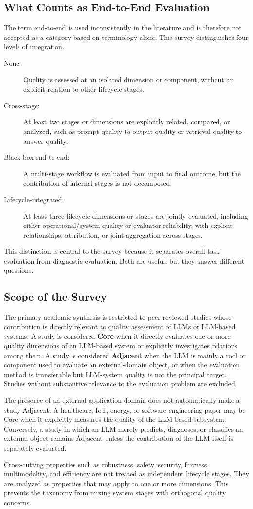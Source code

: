 \subsection{What Counts as End-to-End Evaluation}

The term end-to-end is used inconsistently in the literature and is therefore not accepted as a category based on terminology alone. This survey distinguishes four levels of integration.

\begin{description}
\item[None:] Quality is assessed at an isolated dimension or component, without an explicit relation to other lifecycle stages.
\item[Cross-stage:] At least two stages or dimensions are explicitly related, compared, or analyzed, such as prompt quality to output quality or retrieval quality to answer quality.
\item[Black-box end-to-end:] A multi-stage workflow is evaluated from input to final outcome, but the contribution of internal stages is not decomposed.
\item[Lifecycle-integrated:] At least three lifecycle dimensions or stages are jointly evaluated, including either operational/system quality or evaluator reliability, with explicit relationships, attribution, or joint aggregation across stages.
\end{description}

This distinction is central to the survey because it separates overall task evaluation from diagnostic evaluation. Both are useful, but they answer different questions.

\subsection{Scope of the Survey}

The primary academic synthesis is restricted to peer-reviewed studies whose contribution is directly relevant to quality assessment of LLMs or LLM-based systems. A study is considered \textbf{Core} when it directly evaluates one or more quality dimensions of an LLM-based system or explicitly investigates relations among them. A study is considered \textbf{Adjacent} when the LLM is mainly a tool or component used to evaluate an external-domain object, or when the evaluation method is transferable but LLM-system quality is not the principal target. Studies without substantive relevance to the evaluation problem are excluded.

The presence of an external application domain does not automatically make a study Adjacent. A healthcare, IoT, energy, or software-engineering paper may be Core when it explicitly measures the quality of the LLM-based subsystem. Conversely, a study in which an LLM merely predicts, diagnoses, or classifies an external object remains Adjacent unless the contribution of the LLM itself is separately evaluated.

Cross-cutting properties such as robustness, safety, security, fairness, multimodality, and efficiency are not treated as independent lifecycle stages. They are analyzed as properties that may apply to one or more dimensions. This prevents the taxonomy from mixing system stages with orthogonal quality concerns.
